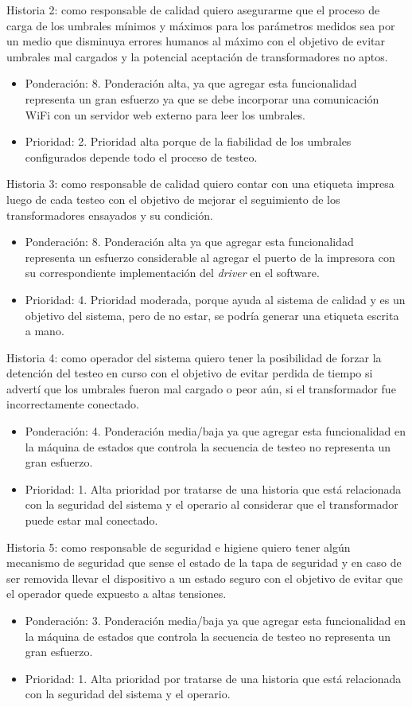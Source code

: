 \documentclass[11pt]{charter}
\begin{document}
Historia 2: como responsable de calidad quiero asegurarme que el proceso de carga de los umbrales mínimos y máximos para los parámetros medidos sea por un medio que disminuya errores humanos al máximo con el objetivo de evitar umbrales mal cargados y la potencial aceptación de transformadores no aptos.
\begin{itemize}
\item Ponderación: 8. Ponderación alta, ya que agregar esta funcionalidad representa un gran esfuerzo ya que se debe incorporar una comunicación WiFi con un servidor web externo para leer los umbrales.
\item Prioridad: 2. Prioridad alta porque de la fiabilidad de los umbrales configurados depende todo el proceso de testeo.
\end{itemize}

Historia 3: como responsable de calidad quiero contar con una etiqueta impresa luego de cada testeo con el objetivo de mejorar el seguimiento de los transformadores ensayados y su condición.
\begin{itemize}
\item Ponderación: 8. Ponderación alta ya que agregar esta funcionalidad representa un esfuerzo considerable al agregar el puerto de la impresora con su correspondiente implementación del \textit{driver} en el software.
\item Prioridad: 4. Prioridad moderada, porque ayuda al sistema de calidad y es un objetivo del sistema, pero de no estar, se podría generar una etiqueta escrita a mano.
\end{itemize}

Historia 4: como operador del sistema quiero tener la posibilidad de forzar la detención del testeo en curso con el objetivo de evitar perdida de tiempo si advertí que los umbrales fueron mal cargado o peor aún, si el transformador fue incorrectamente conectado.
\begin{itemize}
\item Ponderación: 4. Ponderación media/baja ya que agregar esta funcionalidad en la máquina de estados que controla la secuencia de testeo no representa un gran esfuerzo.
\item Prioridad: 1. Alta prioridad por tratarse de una historia que está relacionada con la seguridad del sistema y el operario al considerar que el transformador puede estar mal conectado.
\end{itemize}

Historia 5: como responsable de seguridad e higiene quiero tener algún mecanismo de seguridad que sense el estado de la tapa de seguridad y en caso de ser removida llevar el dispositivo a un estado seguro con el objetivo de evitar que el operador quede expuesto a altas tensiones.
\begin{itemize}
\item Ponderación: 3. Ponderación media/baja ya que agregar esta funcionalidad en la máquina de estados que controla la secuencia de testeo no representa un gran esfuerzo.
\item Prioridad: 1. Alta prioridad por tratarse de una historia que está relacionada con la seguridad del sistema y el operario.
\end{itemize}
\end{document}
